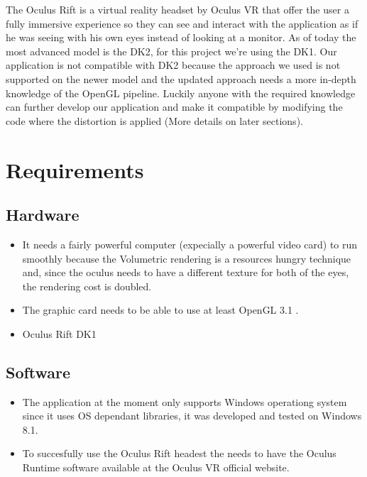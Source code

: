 \documentclass[11pt]{article} %
\begin{document}
The Oculus Rift  is a virtual reality headset by Oculus VR that offer the user a fully immersive experience so they can see and interact with the application as if he was seeing with his own eyes instead of looking at a monitor. As of today the most advanced model is the DK2, for this project we're using the DK1. Our application is not compatible with DK2 because the approach we used is not supported on the newer model and the updated approach needs a more in-depth knowledge of the OpenGL pipeline. Luckily anyone with the required knowledge can further develop our application and make it compatible by modifying the code where the distortion is applied (More details on later sections).









\newpage
\section{Requirements}

\subsection{Hardware}
\begin{itemize}
\item It needs a fairly powerful computer (expecially a powerful video card) to run smoothly because the Volumetric rendering is a resources hungry technique and, since the oculus needs to have a different texture for both of the eyes, the rendering cost is doubled.

\item The graphic card needs to be able to use at least OpenGL 3.1 .

\item Oculus Rift DK1
\end{itemize}


\subsection{Software}
\begin{itemize}
\item The application at the moment only supports Windows operationg system since it uses OS dependant libraries, it was developed and tested on Windows 8.1.
\item To succesfully use the Oculus Rift headest the needs to have the Oculus Runtime software available at the Oculus VR official website.
\end{itemize}
\end{document}
